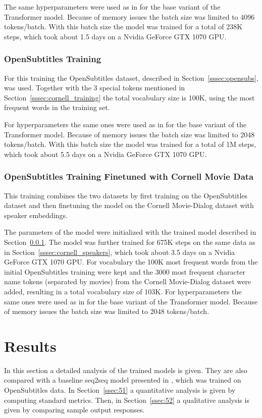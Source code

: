 \documentclass[12pt]{article}
\begin{document}
The same hyperparameters were used as in \cite{Vaswani:2017} for the base variant of the Transformer model. Because of memory issues the batch size was limited to 4096 tokens/batch. With this batch size the model was trained for a total of 238K steps, which took about 1.5 days on a Nvidia GeForce GTX 1070 GPU.
\subsubsection{OpenSubtitles Training} \label{sssec:opensubs_training}
For this training the OpenSubtitles dataset, described in Section~\ref{sssec:opensubs}, was used. Together with the 3 special tokens mentioned in Section~\ref{sssec:cornell_training} the total vocabulary size is 100K, using the most frequent words in the training set.

For hyperparameters the same ones were used as in \cite{Vaswani:2017} for the base variant of the Transformer model. Because of memory issues the batch size was limited to 2048 tokens/batch. With this batch size the model was trained for a total of 1M steps, which took about 5.5 days on a Nvidia GeForce GTX 1070 GPU.
\subsubsection{OpenSubtitles Training Finetuned with Cornell Movie Data} \label{sssec:finetune_training}
This training combines the two datasets by first training on the OpenSubtitles dataset and then finetuning the model on the Cornell Movie-Dialog dataset with speaker embeddings. 

The parameters of the model were initialized with the trained model described in Section~\ref{sssec:opensubs_training}. The model was further trained for 675K steps on the same data as in Section~\ref{sssec:cornell_speakers}, which took about 3.5 days on a Nvidia GeForce GTX 1070 GPU. For vocabulary the 100K most frequent words from the initial OpenSubtitles training were kept and the 3000 most frequent character name tokens (separated by movies) from the Cornell Movie-Dialog dataset were added, resulting in a total vocabulary size of 103K. For hyperparameters the same ones were used as in \cite{Vaswani:2017} for the base variant of the Transformer model. Because of memory issues the batch size was limited to 2048 tokens/batch.

\newpage\section{Results} \label{sec:results}
In this section a detailed analysis of the trained models is given. They are also compared with a baseline seq2seq model presented in \cite{Vinyals:2015}, which was trained on OpenSubtitles data. In Section~\ref{ssec:51} a quantitative analysis is given by computing standard metrics. Then, in Section~\ref{ssec:52} a qualitative analysis is given by comparing sample output responses.
\end{document}
